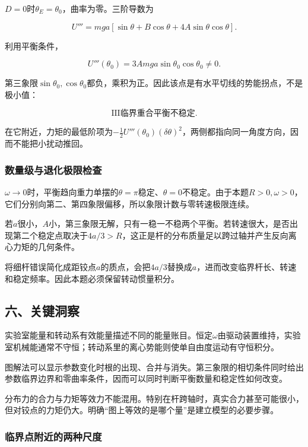 \documentclass[12pt,a4paper,fontset=fandol]{ctexart}
\begin{document}
\(D=0\)时\(\theta_E=\theta_0\)，曲率为零。三阶导数为

\[
U'''=mga[\sin\theta+B\cos\theta+4A\sin\theta\cos\theta].
\]

利用平衡条件，

\[
U'''(\theta_0)
=3Amga\sin\theta_0\cos\theta_0\neq0.
\]

第三象限\(\sin\theta_0,\cos\theta_0\)都负，乘积为正。因此该点是有水平切线的势能拐点，不是极小值：

\[
\boxed{\mathrm{III}\text{临界重合平衡不稳定}}.
\]

在它附近，力矩的最低阶项为\(-\tfrac12U'''(\theta_0)(\delta\theta)^2\)，两侧都指向同一角度方向，因而不能把小扰动推回。

\subsubsection{数量级与退化极限检查}\label{ux6570ux91cfux7ea7ux4e0eux9000ux5316ux6781ux9650ux68c0ux67e5}

\(\omega\to0\)时，平衡趋向重力单摆的\(\theta=\pi\)稳定、\(\theta=0\)不稳定。由于本题\(R>0,\omega>0\)，它们分别向第二、第四象限偏移，所以象限计数与零转速极限连续。

若\(a\)很小，\(A\)小，第三象限无解，只有一稳一不稳两个平衡。若转速很大，是否出现第二个稳定点取决于\(4a/3>R\)，这正是杆的分布质量足以跨过轴并产生反向离心力矩的几何条件。

将细杆错误简化成距铰点\(a\)的质点，会把\(4a/3\)替换成\(a\)，进而改变临界杆长、转速和稳定频率。因此本题必须保留转动惯量积分。

\subsection{六、关键洞察}\label{ux516dux5173ux952eux6d1eux5bdf-3}

实验室能量和转动系有效能量描述不同的能量账目。恒定\(\omega\)由驱动装置维持，实验室机械能通常不守恒；转动系里的离心势能则使单自由度运动有守恒积分。

图解法可以显示参数变化时根的出现、合并与消失。第三象限的相切条件同时给出参数临界边界和零曲率条件，因而可以同时判断平衡数量和稳定性如何改变。

分布力的合力与力矩等效力不能混用。特别在杆跨轴时，真实合力甚至可能很小，但对铰点的力矩仍大。明确``图上等效的是哪个量''是建立模型的必要步骤。

\subsubsection{临界点附近的两种尺度}\label{ux4e34ux754cux70b9ux9644ux8fd1ux7684ux4e24ux79cdux5c3aux5ea6}
\end{document}
